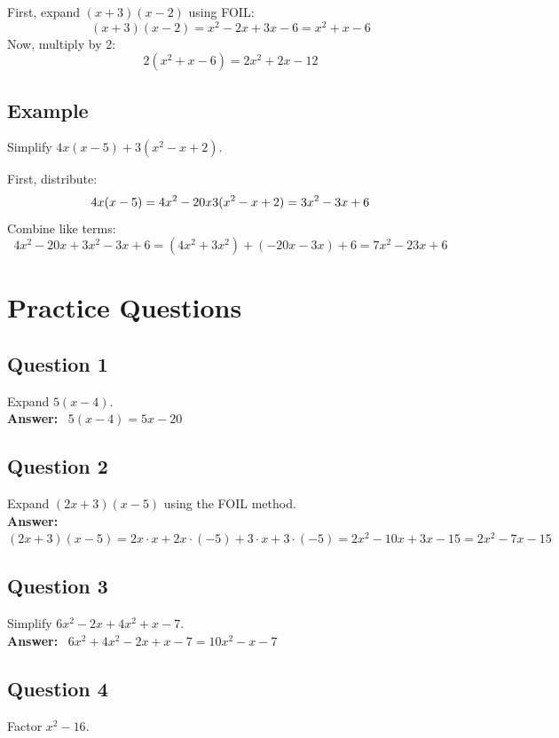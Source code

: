 \documentclass[12pt]{article}
\begin{document}
First, expand \( (x + 3)(x - 2) \) using FOIL:
\[
(x + 3)(x - 2) = x^2 - 2x + 3x - 6 = x^2 + x - 6
\]
Now, multiply by 2:
\[
2(x^2 + x - 6) = 2x^2 + 2x - 12
\]

\vfill

\subsection*{Example}
Simplify \( 4x(x - 5) + 3(x^2 - x + 2) \).

First, distribute:
\[
4x(x - 5) = 4x^2 - 20x \\
3(x^2 - x + 2) = 3x^2 - 3x + 6
\]
Combine like terms:
\[
4x^2 - 20x + 3x^2 - 3x + 6 = (4x^2 + 3x^2) + (-20x - 3x) + 6 = 7x^2 - 23x + 6
\]

\vfill

\newpage

\section*{Practice Questions}
\subsection*{Question 1}
Expand \( 5(x - 4) \).\\

\textbf{Answer:} \ \(5(x - 4) = 5x - 20\)

\subsection*{Question 2}
Expand \( (2x + 3)(x - 5) \) using the FOIL method.\\

\textbf{Answer:}\\
\(
(2x + 3)(x - 5) = 2x \cdot x + 2x \cdot (-5) + 3 \cdot x + 3 \cdot (-5) = 2x^2 - 10x + 3x - 15 = 2x^2 - 7x - 15
\)

\subsection*{Question 3}
Simplify \( 6x^2 - 2x + 4x^2 + x - 7 \).\\

\textbf{Answer:} \ \(6x^2 + 4x^2 - 2x + x - 7 = 10x^2 - x - 7\)

\subsection*{Question 4}
Factor \( x^2 - 16 \).\\
\end{document}
